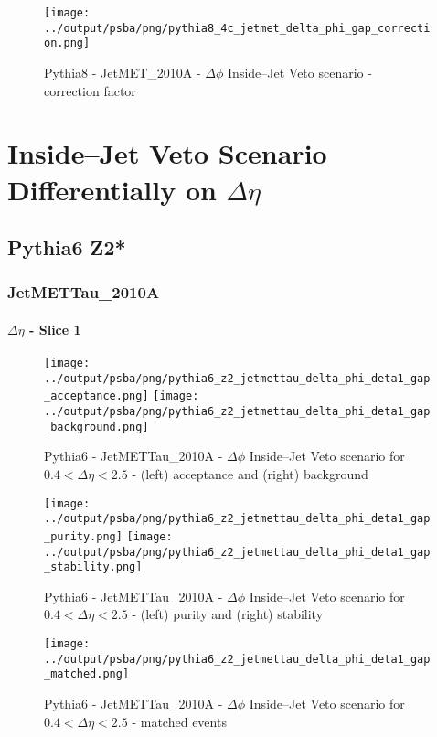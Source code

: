 \documentclass[11pt]{book}
\begin{document}
\begin{figure}[ht]
\centering
\texttt{[image: ../output/psba/png/pythia8\_4c\_jetmet\_delta\_phi\_gap\_correction.png]}
\caption{Pythia8 - JetMET\_2010A - $\Delta\phi$ Inside--Jet Veto scenario - correction factor}
\label{fig:p8_jetmet_delta_phi_gap_correction}
\end{figure}



\clearpage
\chapter{Inside--Jet Veto Scenario Differentially on $\Delta\eta$}
\section{Pythia6 Z2*}
\subsection{JetMETTau\_2010A}

\subsubsection{$\Delta\eta$ - Slice 1}
\begin{figure}[ht]
\centering
\texttt{[image: ../output/psba/png/pythia6\_z2\_jetmettau\_delta\_phi\_deta1\_gap\_acceptance.png]}
\texttt{[image: ../output/psba/png/pythia6\_z2\_jetmettau\_delta\_phi\_deta1\_gap\_background.png]}
\caption{Pythia6 - JetMETTau\_2010A - $\Delta\phi$ Inside--Jet Veto scenario for $0.4 < \Delta\eta < 2.5$ - (left) acceptance and (right) background}
\label{fig:p6_jetmettau_delta_phi_deta1_gap_ab}
\end{figure}

\begin{figure}[ht]
\centering
\texttt{[image: ../output/psba/png/pythia6\_z2\_jetmettau\_delta\_phi\_deta1\_gap\_purity.png]}
\texttt{[image: ../output/psba/png/pythia6\_z2\_jetmettau\_delta\_phi\_deta1\_gap\_stability.png]}
\caption{Pythia6 - JetMETTau\_2010A - $\Delta\phi$ Inside--Jet Veto scenario for $0.4 < \Delta\eta < 2.5$ - (left) purity and (right) stability}
\label{fig:p6_jetmettau_delta_phi_deta1_gap_ps}
\end{figure}

\begin{figure}[ht]
\centering
\texttt{[image: ../output/psba/png/pythia6\_z2\_jetmettau\_delta\_phi\_deta1\_gap\_matched.png]}
\caption{Pythia6 - JetMETTau\_2010A - $\Delta\phi$ Inside--Jet Veto scenario for $0.4 < \Delta\eta < 2.5$ - matched events}
\label{fig:p6_jetmettau_delta_phi_deta1_gap_matched}
\end{figure}
\end{document}
